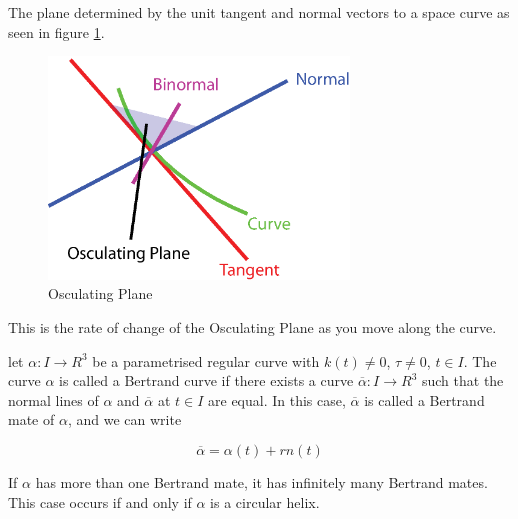 \begin{definition}
The plane determined by the unit tangent and normal vectors to a space curve as seen in figure \ref{fig:oscplane}.
\begin{figure}[htbp]
	\centering
       \includegraphics[width=8cm]{Images/OsculatingPlane.eps}
   \caption{Osculating Plane}
   \label{fig:oscplane}
\end{figure}
\end{definition}

\begin{definition}[Torsion]
This is the rate of change of the Osculating Plane as you move along the curve.
\end{definition}

\begin{definition}
let $\alpha: I \rightarrow R^3$ be a parametrised regular curve with $k(t) \neq 0$, $\tau \neq 0$, $t \in I$. The curve $\alpha$ is called a Bertrand curve if there exists a curve $\overline{\alpha}: I \rightarrow R^3$ such that the normal lines of $\alpha$ and $\overline{\alpha}$ at $t \in I$ are equal. In this case, $\overline{\alpha}$ is called a Bertrand mate of $\alpha$, and we can write

\begin{displaymath}
\overline{\alpha}= \alpha(t) + rn(t)
\end{displaymath}

\end{definition}

\begin{lemma}
If $\alpha$ has more than one Bertrand mate, it has infinitely many Bertrand mates. This case occurs if and only if $\alpha$ is a circular helix.
\label{lem:CircHelix}
\end{lemma}

